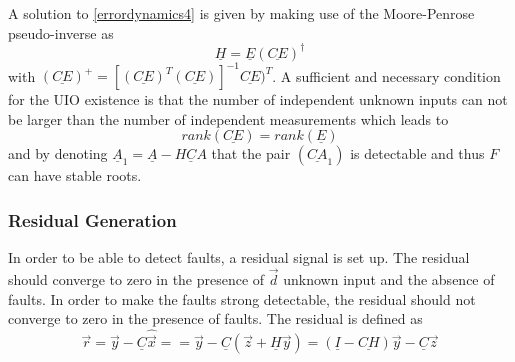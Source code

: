 A solution to \eqref{errordynamics4} is given by making use of the Moore-Penrose pseudo-inverse as
\begin{equation}
\underline H = \underline E (\underline{CE})^\dagger
\label{errordynamics9}
\end{equation}
with $(\underline{CE})^{+} = [(\underline{CE})^{T} (\underline{CE})]^{-1}\underline{CE})^{T} $.
A sufficient and necessary condition for the UIO existence is that the number of independent unknown inputs can not be larger than the number of independent measurements which leads to
\begin{equation}
rank (\underline{CE}) =rank( \underline E) 
\label{errordynamics10}
\end{equation}
and by denoting $\underline A_1 = \underline A - \underline{HCA} $ that the pair $(\underline {CA}_1)$ is detectable and thus $F$ can have stable roots.


\subsubsection{Residual Generation}

In order to be able to detect faults, a residual signal is set up.  The residual should converge to zero in the presence of $\vec{d}$ unknown input and the absence of faults. In order to make the faults strong detectable, the residual should not converge to zero in the presence of faults. The residual is defined as
\begin{equation*}
\vec{r} = \vec{y} - \underline C \hat{\vec{x}} 
\label{errordynamics11} = 
= \vec{y} - \underline C (\vec{z} + \underline{H} \vec{y} ) 
= (\underline I  -\underline{ CH})\vec{y}   -\underline C \vec{z} 
\end{equation*}

